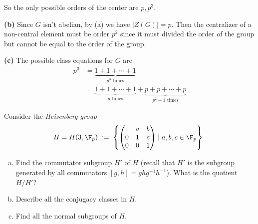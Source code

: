 \documentclass[11pt,letterpaper]{article}
\begin{document}
So the only possible orders of the center are $p, p^3$. 

\textbf{(b)} Since $G$ isn't abelian, by (a) we have $|Z(G)|=p$. Then the centralizer of a non-central element must be order $p^2$ since it must divided the order of the group but cannot be equal to the order of the group.   

\textbf{(c)} The possible class equations for $G$ are 
\[
  \begin{aligned}
    p^3&=\underbrace{1+1+\cdots+1}_{p^3\textrm{ times}}\\
    &=\underbrace{1+1+\cdots+1}_{p\textrm{ times}}+\underbrace{p+p+\cdots+p}_{p^2-1\textrm{ times}}
  \end{aligned}
\]  


\pagebreak
\begin{problem}
Consider the \emph{Heisenberg group}
\[
H = H(3, \F_p) \; := \; \left\{ 
\begin{pmatrix}
1 & a & b \\
0 & 1 & c \\
0 & 0 & 1
\end{pmatrix}
\mid a, b, c \in \F_p \right\}.
\]
\begin{enumerate}[(a)]
  \item Find the commutator subgroup $H'$ of $H$ (recall that $H'$
  is the subgroup generated by all commutators $[g,h]=ghg^{-1}h^{-1}$). 
  What is the quotient $H/H'$?
  \item Describe all the conjugacy classes in $H$.
  \item Find all the normal subgroups of $H$.
\end{enumerate}
\end{problem}
\end{document}
